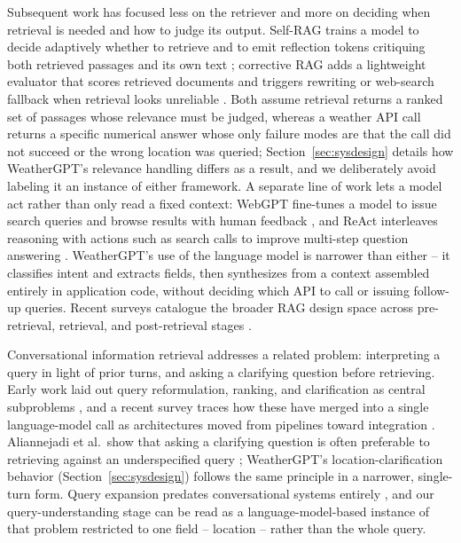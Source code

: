 \documentclass[sigconf,natbib=true,anonymous=true]{acmart}
\begin{document}
Subsequent work has focused less on the retriever and more on deciding when retrieval is needed and how to judge its output. Self-RAG trains a model to decide adaptively whether to retrieve and to emit reflection tokens critiquing both retrieved passages and its own text \citep{asai2024selfrag}; corrective RAG adds a lightweight evaluator that scores retrieved documents and triggers rewriting or web-search fallback when retrieval looks unreliable \citep{yan2024crag}. Both assume retrieval returns a ranked set of passages whose relevance must be judged, whereas a weather API call returns a specific numerical answer whose only failure modes are that the call did not succeed or the wrong location was queried; Section~\ref{sec:sysdesign} details how WeatherGPT's relevance handling differs as a result, and we deliberately avoid labeling it an instance of either framework. A separate line of work lets a model act rather than only read a fixed context: WebGPT fine-tunes a model to issue search queries and browse results with human feedback \citep{nakano2021webgpt}, and ReAct interleaves reasoning with actions such as search calls to improve multi-step question answering \citep{yao2023react}. WeatherGPT's use of the language model is narrower than either -- it classifies intent and extracts fields, then synthesizes from a context assembled entirely in application code, without deciding which API to call or issuing follow-up queries. Recent surveys catalogue the broader RAG design space across pre-retrieval, retrieval, and post-retrieval stages \citep{gao2023ragsurvey}.

Conversational information retrieval addresses a related problem: interpreting a query in light of prior turns, and asking a clarifying question before retrieving. Early work laid out query reformulation, ranking, and clarification as central subproblems \citep{gao2020cir}, and a recent survey traces how these have merged into a single language-model call as architectures moved from pipelines toward integration \citep{mo2025conversationalsearch}. Aliannejadi et al.\ show that asking a clarifying question is often preferable to retrieving against an underspecified query \citep{aliannejadi2019clarifying}; WeatherGPT's location-clarification behavior (Section~\ref{sec:sysdesign}) follows the same principle in a narrower, single-turn form. Query expansion predates conversational systems entirely \citep{azad2019queryexpansion}, and our query-understanding stage can be read as a language-model-based instance of that problem restricted to one field -- location -- rather than the whole query.
\end{document}
